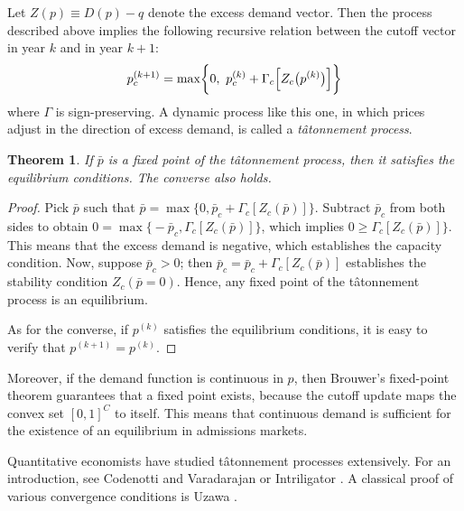 \documentclass[12pt]{article}
\newtheorem{theorem}{Theorem}
\theoremstyle{definition}
\begin{document}
Let $Z(p) \equiv D(p) - q$ denote the excess demand vector. Then the process described above implies the following recursive relation between the cutoff vector in year $k$ and in year $k+1$:
\[p_c^{(k+1)} = \max\biggl\{0,~p_c^{(k)}+ \Gamma_c\Bigl[Z_c\bigl(p^{(k)}\bigr)\Bigr] \biggr\}\]
where $\Gamma$ is sign-preserving. A dynamic process like this one, in which prices adjust in the direction of excess demand, is called a \emph{t\^{a}tonnement process}.
\begin{theorem}
If $\bar p$ is a fixed point of the t\^{a}tonnement process, then it satisfies the equilibrium conditions. The converse also holds.
\end{theorem}
\begin{proof} Pick $\bar p$ such that $\bar p = \max\bigl\{0, \bar p_c + \Gamma_c\left[Z_c(\bar p)\right] \bigr\}$. Subtract $\bar p_c$ from both sides to obtain $0 = \max\bigl\{-\bar p_c,\Gamma_c\left[Z_c(\bar p)\right] \bigr\}$, which implies $0 \geq \Gamma_c\left[Z_c(\bar p)\right] \bigr\}$. This means that the excess demand is negative, which establishes the capacity condition. Now, suppose $\bar p_c > 0$; then $\bar p_c =  \bar p_c + \Gamma_c\left[Z_c(\bar p)\right] $ establishes the stability condition $Z_c(\bar p = 0)$. Hence, any fixed point of the t\^{a}tonnement process is an equilibrium. 

As for the converse, if $p^{(k)}$ satisfies the equilibrium conditions, it is easy to verify that $p^{(k+1)} = p^{(k)}$. \end{proof}

Moreover, if the demand function is continuous in $p$, then Brouwer's fixed-point theorem guarantees that a fixed point exists, because the cutoff update maps the convex set $[0, 1]^C$ to itself. This means that continuous demand is sufficient for the existence of an equilibrium in admissions markets. 

Quantitative economists have studied t\^{a}tonnement processes extensively. For an introduction, see Codenotti and Varadarajan \parencite*{compmkteq} or Intriligator \parencite*[][chap. 9]{mathematicaloptandecontheory}. A classical proof of various convergence conditions is Uzawa \parencite*{walrastatonnement}. 
\end{document}
